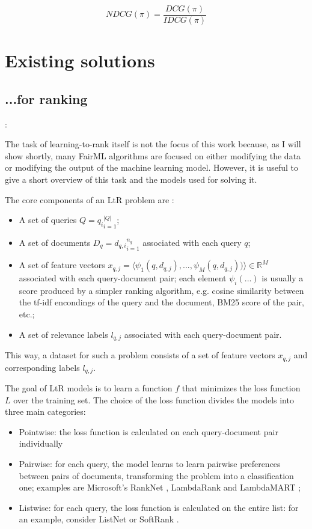 \[NDCG(\pi) = \frac{DCG(\pi)}{IDCG(\pi)}\]




\section{Existing solutions}\label{sect:int_3}

\subsection{...for ranking}:

The task of learning-to-rank itself is not the focus of this work because, as I will show shortly, many FairML algorithms are focused on either modifying the data or modifying the output of the machine learning model. However, it is useful to give a short overview of this task and the models used for solving it. 

The core components of an LtR problem are \cite{Qin2010LETORAB}:
\begin{itemize}
\item A set of queries $Q = {q_i}_{i=1}^{|Q|}$;
\item A set of documents $D_q = {d_{q,i}}_{i=1}^{n_q}$ associated with each query $q$;
\item A set of feature vectors $x_{q,j} = \langle \psi_1 (q, d_{q,j}), ..., \psi_M (q, d_{q,j})) \rangle \in \mathbb{R}^M$ associated with each query-document pair; each element $\psi_i (...)$ is usually a score produced by a simpler ranking algorithm, e.g. cosine similarity between the tf-idf encondings of the query and the document, BM25 score of the pair, etc.;
\item A set of relevance labels $l_{q,j}$ associated with each query-document pair.
\end{itemize}

This way, a dataset for such a problem consists of a set of feature vectors $x_{q,j}$ and corresponding labels $l_{q,j}$.

The goal of LtR models is to learn a function $f$ that minimizes the loss function $L$ over the training set. The choice of the loss function divides the models into three main categories:

\begin{itemize}
\item Pointwise: the loss function is calculated on each query-document pair individually
\item Pairwise: for each query, the model learns to learn pairwise preferences between pairs of documents, transforming the problem into a classification one;
examples are Microsoft’s RankNet \cite{RankNet}, LambdaRank \cite{LambdaRank} and LambdaMART \cite{LambdaMART};
\item Listwise: for each query, the loss function is calculated on the entire list: for an example, consider ListNet \cite{ListNet} or SoftRank \cite{taylor2008softrank}.
\end{itemize}

